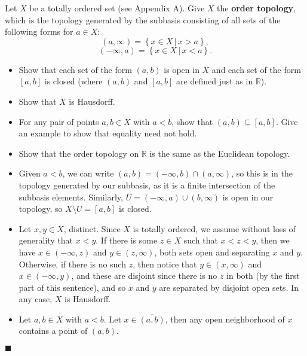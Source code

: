 \documentclass[12pt]{article}
\renewcommand{\qed}{\hfill$\blacksquare$}
\renewenvironment{proof}{\begin{addmargin}[1em]{0em}\begin{newproof}}{\end{newproof}\end{addmargin}\qed}
\newenvironment{problem}[2][Problem]{\begin{trivlist}
\item[\hskip \labelsep {\bfseries #1}\hskip \labelsep {\bfseries #2.}]}{\end{trivlist}}
\begin{document}
\begin{problem}{2-13}
Let $X$ be a totally ordered set (see Appendix A). Give $X$ the \textbf{order topology}, which is the topology generated by the subbasis consisting of all sets of the following forms for $a\in X$:
$$ \left(a,\infty\right) = \left\{x\in X \, | \, x>a\right\}, $$
$$ \left(-\infty,a\right) = \left\{x\in X\, | \, x<a\right\}.$$
\begin{itemize}
	\item Show that each set of the form $\left(a,b\right)$ is open in $X$ and each set of the form $\left[a,b\right]$ is closed (where $\left(a,b\right)$ and $\left[a,b\right]$ are defined just as in $\mathbb{R}$).
	\item Show that $X$ is Hausdorff.
	\item For any pair of points $a,b\in X$ with $a<b$, show that $\overline{\left(a,b\right)} \subseteq \left[a,b\right]$. Give an example to show that equality need not hold.
	\item Show that the order topology on $\mathbb{R}$ is the same as the Euclidean topology.
\end{itemize}
\end{problem}
\begin{proof}
\begin{itemize}
	\item Given $a<b$, we can write $\left(a,b\right) = \left(-\infty,b\right)\cap\left(a,\infty\right)$, so this is in the topology generated by our subbasis, as it is a finite intersection of the subbasis elements. Similarly, $U = \left(-\infty,a\right)\cup\left(b,\infty\right)$ is open in our topology, so $X\setminus U = \left[a,b\right]$ is closed.
	\item Let $x,y\in X$, distinct. Since $X$ is totally ordered, we assume without loss of generality that $x < y$. If there is some $z\in X$ such that $x < z < y$, then we have $x \in \left(-\infty,z\right)$ and $y \in \left(z,\infty\right)$, both sets open and separating $x$ and $y$. Otherwise, if there is no such $z$, then notice that $y \in \left(x,\infty\right)$ and $x \in \left(-\infty,y\right)$, and these are disjoint since there is no $z$ in both (by the first part of this sentence), and so $x$ and $y$ are separated by disjoint open sets. In any case, $X$ is Hausdorff.
	\item Let $a,b\in X$ with $a< b$. Let $x \in \overline{\left(a,b\right)}$, then any open neighborhood of $x$ contains a point of $\left(a,b\right)$.
\end{itemize}
\end{proof}
\end{document}
